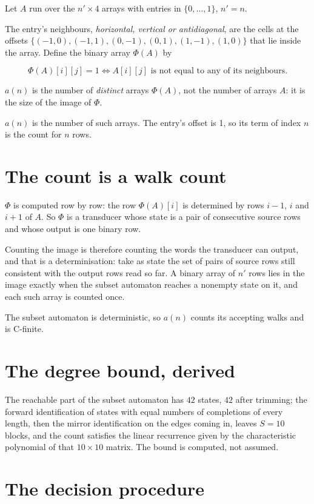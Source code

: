 \documentclass[11pt]{article}
\theoremstyle{definition}
\begin{document}
Let $A$ run over the $n' \times 4$ arrays with entries in $\{0,\dots,1\}$, $n' = n$.

The entry's neighbours, {\itshape horizontal, vertical or antidiagonal}, are the cells at the offsets $\{(-1,0), (-1,1), (0,-1), (0,1), (1,-1), (1,0)\}$ that lie inside the array. Define the binary array $\Phi(A)$ by

\[\Phi(A)[i][j] = 1 \iff A[i][j] \text{ is not equal to any of its neighbours}.\]

$a(n)$ is the number of {\itshape distinct} arrays $\Phi(A)$, not the number of arrays $A$: it is the size of the image of $\Phi$.

$a(n)$ is the number of such arrays. The entry's offset is 1, so its term of index $n$ is the count for $n$ rows.

\section{The count is a walk count}

$\Phi$ is computed row by row: the row $\Phi(A)[i]$ is determined by rows $i-1$, $i$ and $i+1$ of $A$. So $\Phi$ is a transducer whose state is a pair of consecutive source rows and whose output is one binary row.

Counting the image is therefore counting the words the transducer can output, and that is a determinisation: take as state the set of pairs of source rows still consistent with the output rows read so far. A binary array of $n'$ rows lies in the image exactly when the subset automaton reaches a nonempty state on it, and each such array is counted once.

The subset automaton is deterministic, so $a(n)$ counts its accepting walks and is C-finite.

\section{The degree bound, derived}

The reachable part of the subset automaton has $42$ states, $42$ after trimming; the forward identification of states with equal numbers of completions of every length, then the mirror identification on the edges coming in, leaves $S = 10$ blocks, and the count satisfies the linear recurrence given by the characteristic polynomial of that $10\times10$ matrix. The bound is computed, not assumed.

\section{The decision procedure}
\end{document}
